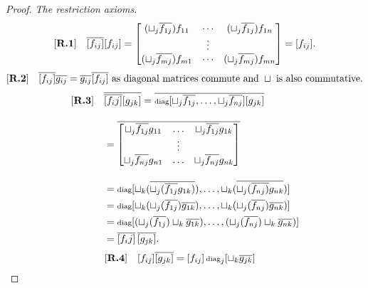 \begin{proof}
  \emph{The restriction axioms.}
  \begin{align*}
    [\text{\bfseries {R}.{1}}] \quad& \overline{[f_{ij}]}[f_{ij}] =
      \begin{bmatrix}
        (\sqcup_j \overline{f_{1j}}) f_{11} & \cdots & (\sqcup_j \overline{f_{1 j}}) f_{1n}\\
        & \vdots & \\
        (\sqcup_j \overline{f_{mj}}) f_{m1} & \cdots & (\sqcup_j \overline{f_{mj}}) f_{m n}
      \end{bmatrix} = [f_{ij}].\\
  \end{align*}
  \begin{align*}
    [\text{\bfseries {R}.{2}}] \quad & \overline{[f_{ij}]} \overline{g_{ij}} =  \overline{g_{ij}} \overline{[f_{ij}]}
      \text{ as diagonal matrices commute and }\sqcup\text{ is also commutative.}\\
  \end{align*}
  \begin{align*}
    [\text{\bfseries {R}.{3}}] \quad & \overline{\overline{[f_ij]}[g_{j k}]} =
      \overline{\operatorname{\scriptstyle{diag}}[\sqcup_j \overline{f_{1j}},\ldots,\sqcup_j \overline{f_{n j}}] [g_{j k}]}
      \\[10pt]
      & = \overline{\begin{bmatrix}
        \sqcup_j \overline{f_{1j}} g_{11} & \ldots & \sqcup_j \overline{f_{1 j}} g_{1 k}\\
        & \vdots & \\
        \sqcup_j \overline{f_{nj}} g_{n 1} & \ldots & \sqcup_j \overline{f_{n j}} g_{n k}\\
      \end{bmatrix}} \\[10pt]
      & = \operatorname{\scriptstyle{diag}}[\sqcup_k (\overline{\sqcup_j (\overline{f_{1j}} g_{1k})}), \ldots,
                 \sqcup_k (\overline{\sqcup_j(\overline{f_{nj})} g_{n k}})]\\
      & = \operatorname{\scriptstyle{diag}}[\sqcup_k (\sqcup_j(\overline{f_{1j}}) \overline{g_{1k}}), \ldots,
                 \sqcup_k (\sqcup_j(\overline{f_{nj}}) \overline{g_{n k}})]\\
      & = \operatorname{\scriptstyle{diag}}[(\sqcup_j(\overline{f_{1j}}) \sqcup_k  \overline{g_{1k}}), \ldots,
                 (\sqcup_j(\overline{f_{nj}}) \sqcup_k  \overline{g_{n k}})]\\
      & = \overline{[f_ij]}\,\overline{[g_{j k}]}.\\
  \end{align*}
  \begin{align*}
      \rfour \quad & [f_{i\jay}]\rst{[g_{\jay k}]} =
        [f_{i\jay}]\diag_\jay[\djoin_k \rst{g_{\jay k}}]

\end{align*}
\end{proof}
